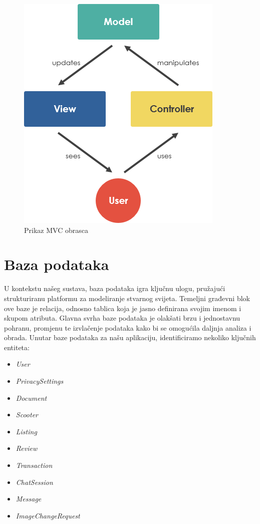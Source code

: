 \begin{figure} [H]

	\includegraphics[width=1\linewidth]{slike/mvc.png}
	\centering
	\caption{Prikaz MVC obrasca}
	\label{fig:Prikaz MVC obrasca}
\end{figure}

\section{Baza podataka}

U kontekstu našeg sustava, baza podataka igra ključnu ulogu, pružajući strukturiranu platformu za modeliranje stvarnog svijeta. Temeljni građevni blok ove baze je relacija, odnosno tablica koja je jasno definirana svojim imenom i skupom atributa. Glavna svrha baze podataka je olakšati brzu i jednostavnu pohranu, promjenu te izvlačenje podataka kako bi se omogućila daljnja analiza i obrada. Unutar baze podataka za našu aplikaciju, identificiramo nekoliko ključnih entiteta:

	\begin{itemize}
		\item 	\textit{User}
		\item 	\textit{PrivacySettings}
		\item 	\textit{Document}
		\item 	\textit{Scooter}
		\item 	\textit{Listing}
		\item 	\textit{Review}
		\item 	\textit{Transaction}
		\item 	\textit{ChatSession}
		\item 	\textit{Message}
		\item 	\textit{ImageChangeRequest}
	\end{itemize}


